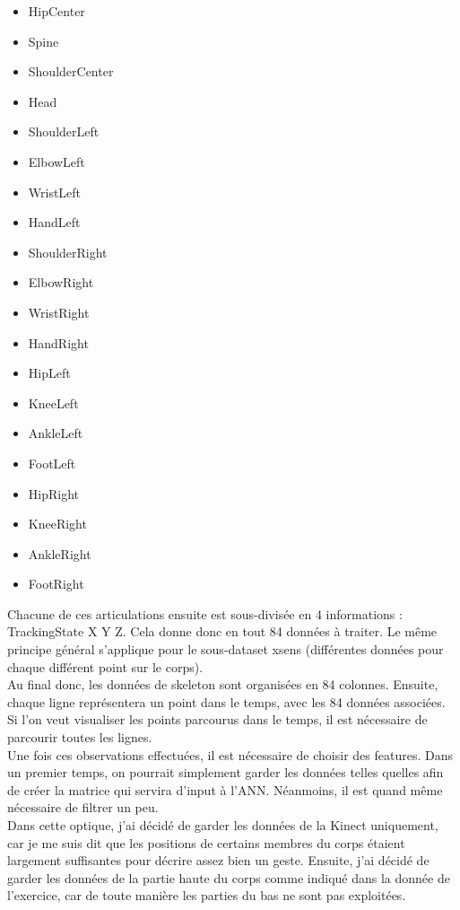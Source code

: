 \begin{itemize}
\item HipCenter 
\item Spine 
\item ShoulderCenter 
\item Head 
\item ShoulderLeft
\item ElbowLeft 
\item WristLeft 
\item HandLeft 
\item ShoulderRight
\item ElbowRight 
\item WristRight 
\item HandRight 
\item HipLeft 
\item KneeLeft
\item AnkleLeft 
\item FootLeft 
\item HipRight 
\item KneeRight 
\item AnkleRight 
\item FootRight
\end{itemize}
\bigskip
Chacune de ces articulations ensuite est sous-divisée en 4 informations : TrackingState X Y Z. Cela donne donc en tout 84 données à traiter. Le même principe général s'applique pour le sous-dataset xsens (différentes données pour chaque différent point sur le corps). \\

Au final donc, les données de skeleton sont organisées en 84 colonnes. Ensuite, chaque ligne représentera un point dans le temps, avec les 84 données associées. Si l'on veut visualiser les points parcourus dans le temps, il est nécessaire de parcourir toutes les lignes. \\

Une fois ces observations effectuées, il est nécessaire de choisir des features. Dans un premier temps, on pourrait simplement garder les données telles quelles afin de créer la matrice qui servira d'input à l'ANN. Néanmoins, il est quand même nécessaire de filtrer un peu. \\

Dans cette optique, j'ai décidé de garder les données de la Kinect uniquement, car je me suis dit que les positions de certains membres du corps étaient largement suffisantes pour décrire assez bien un geste. Ensuite, j'ai décidé de garder les données de la partie haute du corps comme indiqué dans la donnée de l'exercice, car de toute manière les parties du bas ne sont pas exploitées. \\

